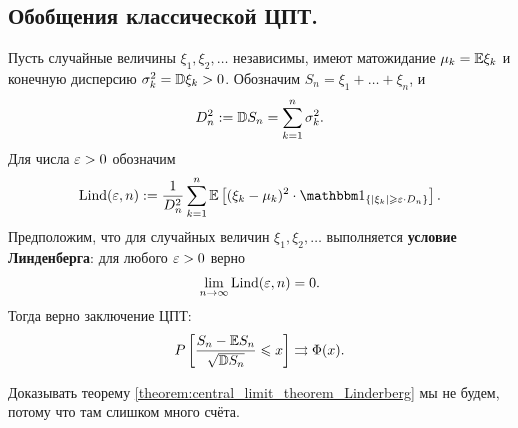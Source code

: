 \documentclass[../main.tex]{subfiles}
\begin{document}
\subsection{Обобщения классической ЦПТ.}

\newcommand{\Lind}{\ensuremath \mathrm{Lind}}

\begin{thm}
 \label{theorem:central_limit_theorem_Linderberg}
 Пусть случайные величины $ \xi_1, \xi_2, \ldots $  независимы, имеют матожидание $ \mu_k = \mathbb E \xi_k $ и конечную дисперсию $\sigma_k^{2} = \mathbb D \xi_k > 0$. Обозначим $ S_n = \xi_1 + \ldots + \xi_n $, и
 \begin{align*}
  D_n^{2} := \mathbb D S_n = \sum_{k=1}^{n} \sigma_k^{2}.
 \end{align*} Для числа $ \varepsilon > 0 $ обозначим
 \begin{align*}
  \Lind(\eps, n) := \frac{1}{D_n^{2}} \sum_{k=1}^{n} \E \left[ (\xi_k-\mu_k)^{2} \cdot \Ind_{\left\{ \left| \xi_k \right| \geqslant \eps \cdot D_n \right\}} \right].
 \end{align*} Предположим, что для случайных величин $ \xi_1,\xi_2,\ldots $ выполняется \textbf{условие Линденберга}: для любого $ \varepsilon > 0 $ верно
 \begin{align}
  \label{eq:lindenberg_condition}
  \lim_{n \to \infty} \Lind(\eps, n) = 0.
 \end{align} Тогда верно заключение ЦПТ:
 \begin{align*}
  P \left[ \frac{S_n - \mathbb E S_n}{\sqrt{\mathbb D S_n}} \leqslant x \right] \rightrightarrows \Phi(x).
 \end{align*}
\end{thm}

Доказывать теорему \ref{theorem:central_limit_theorem_Linderberg} мы не будем, потому что там слишком много счёта.
\end{document}
